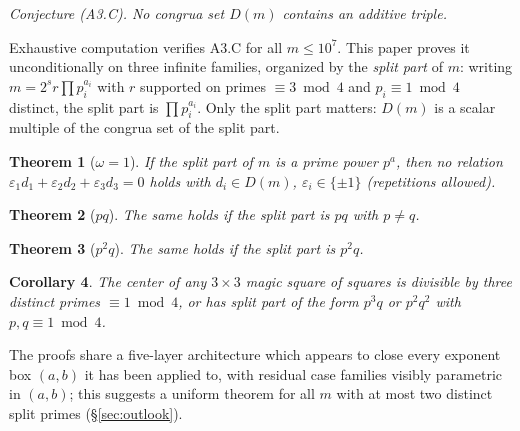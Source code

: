 \documentclass[11pt]{amsart}
\newtheorem{theorem}{Theorem}[section]
\newtheorem{corollary}[theorem]{Corollary}
\theoremstyle{definition}
\begin{document}
\begin{center}
\emph{Conjecture (A3.C). No congrua set $D(m)$ contains an
additive triple.}
\end{center}

Exhaustive computation verifies A3.C for all $m \le 10^7$. This
paper proves it unconditionally on three infinite families,
organized by the \emph{split part} of $m$: writing
$m = 2^s r \prod p_i^{a_i}$ with $r$ supported on primes
$\equiv 3 \bmod 4$ and $p_i \equiv 1 \bmod 4$ distinct, the split
part is $\prod p_i^{a_i}$. Only the split part matters: $D(m)$ is
a scalar multiple of the congrua set of the split part.

\begin{theorem}[$\omega = 1$]\label{thm:omega1}
If the split part of $m$ is a prime power $p^a$, then no relation
$\varepsilon_1 d_1 + \varepsilon_2 d_2 + \varepsilon_3 d_3 = 0$
holds with $d_i \in D(m)$, $\varepsilon_i \in \{\pm1\}$
(repetitions allowed).
\end{theorem}

\begin{theorem}[$pq$]\label{thm:pq}
The same holds if the split part is $pq$ with $p \ne q$.
\end{theorem}

\begin{theorem}[$p^2q$]\label{thm:p2q}
The same holds if the split part is $p^2 q$.
\end{theorem}

\begin{corollary}\label{cor:mss3}
The center of any $3\times3$ magic square of squares is divisible
by three distinct primes $\equiv 1 \bmod 4$, or has split part of
the form $p^3q$ or $p^2q^2$ with $p, q \equiv 1 \bmod 4$.
\end{corollary}

The proofs share a five-layer architecture which appears to close
every exponent box $(a,b)$ it has been applied to, with residual
case families visibly parametric in $(a,b)$; this suggests a
uniform theorem for all $m$ with at most two distinct split primes
(\S\ref{sec:outlook}).
\end{document}
